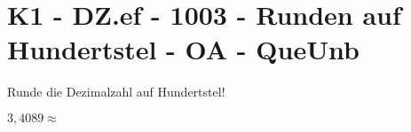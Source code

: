\section{K1 - DZ.ef - 1003 - Runden auf Hundertstel - OA - QueUnb}

\begin{beispiel}{0} %
				Runde die Dezimalzahl auf Hundertstel!\leer
					
					$3,4089\approx$ 
\end{beispiel}